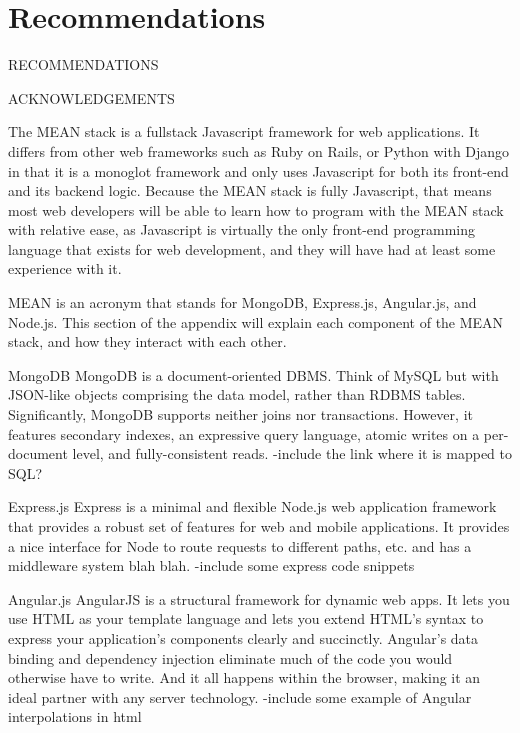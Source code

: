 \documentclass[12pt]{article}
\begin{document}
\section{Recommendations}
RECOMMENDATIONS

\newpage



\newpage


ACKNOWLEDGEMENTS
\newpage



The MEAN stack is a fullstack Javascript framework for web applications. It differs from other web frameworks such as Ruby on Rails, or Python with Django in that it is a monoglot framework and only uses Javascript for both its front-end and its backend logic. Because the MEAN stack is fully Javascript, that means most web developers will be able to learn how to program with the MEAN stack with relative ease, as Javascript is virtually the only front-end programming language that exists for web development, and they will have had at least some experience with it.

MEAN is an acronym that stands for MongoDB, Express.js, Angular.js, and Node.js. This section of the appendix will explain each component of the MEAN stack, and how they interact with each other.

MongoDB %
MongoDB is a document-oriented DBMS. Think of MySQL but with JSON-like objects comprising the data model, rather than RDBMS tables. Significantly, MongoDB supports neither joins nor transactions. However, it features secondary indexes, an expressive query language, atomic writes on a per-document level, and fully-consistent reads.
-include the link where it is mapped to SQL?

Express.js %
Express is a minimal and flexible Node.js web application framework that provides a robust set of features for web and mobile applications.
It provides a nice interface for Node to route requests to different paths, etc. and has a middleware system blah blah.
-include some express code snippets

Angular.js %
AngularJS is a structural framework for dynamic web apps. It lets you use HTML as your template language and lets you extend HTML's syntax to express your application's components clearly and succinctly. Angular's data binding and dependency injection eliminate much of the code you would otherwise have to write. And it all happens within the browser, making it an ideal partner with any server technology.
-include some example of Angular interpolations in html
\end{document}
